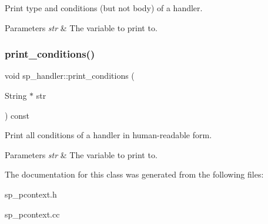Print type and conditions (but not body) of a handler.


\begin{DoxyParams}{Parameters}
{\em str} & The variable to print to. \\
\hline
\end{DoxyParams}
\mbox{\label{classsp__handler_a63f42365a8485bdc497f09beab7c3b82}} 
\subsubsection{\texorpdfstring{print\+\_\+conditions()}{print\_conditions()}}
{\footnotesize\ttfamily void sp\+\_\+handler\+::print\+\_\+conditions (\begin{DoxyParamCaption}\item[{String $\ast$}]{str }\end{DoxyParamCaption}) const}

Print all conditions of a handler in human-\/readable form.


\begin{DoxyParams}{Parameters}
{\em str} & The variable to print to. \\
\hline
\end{DoxyParams}


The documentation for this class was generated from the following files\+:\begin{DoxyCompactItemize}
\item 
sp\+\_\+pcontext.\+h\item 
sp\+\_\+pcontext.\+cc\end{DoxyCompactItemize}
